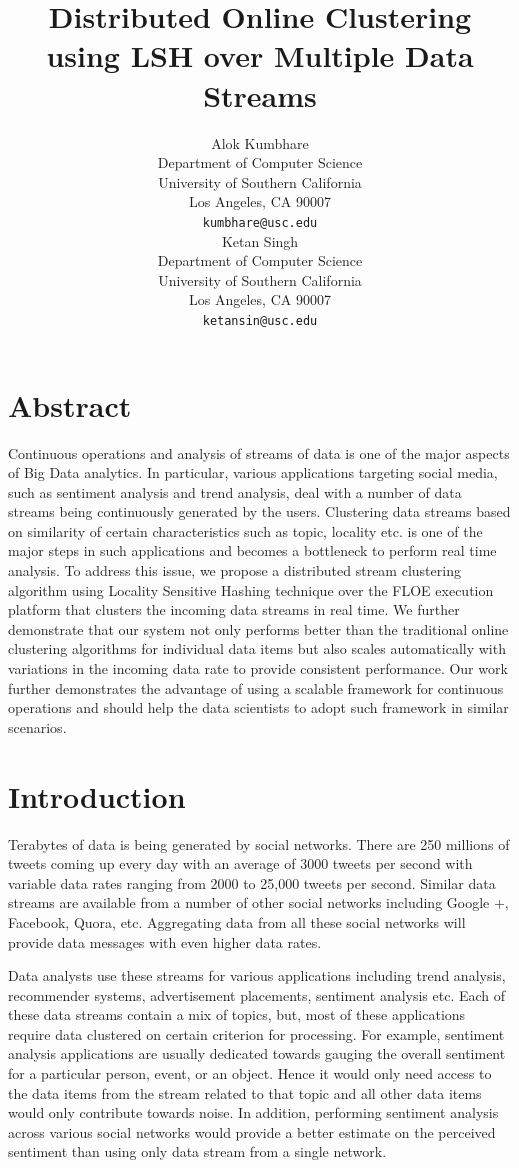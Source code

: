 \documentclass{article} %
\title{Distributed Online Clustering using LSH over Multiple Data Streams}
\author{
Alok Kumbhare \\
Department of Computer Science \\
University of Southern California \\
Los Angeles, CA 90007 \\
\texttt{kumbhare@usc.edu} \\
\And
Ketan Singh \\
Department of Computer Science \\
University of Southern California \\
Los Angeles, CA 90007 \\
\texttt{ketansin@usc.edu} \\
}
\begin{document}
\maketitle

\section{Abstract}
Continuous operations and analysis of streams of data is one of the major aspects of Big Data analytics. In particular, various applications targeting social media, such as sentiment analysis and trend analysis, deal with a number of data streams being continuously generated by the users. Clustering data streams based on similarity of certain characteristics such as topic, locality etc. is one of the major steps in such applications and becomes a bottleneck to perform real time analysis. To address this issue, we propose a distributed stream clustering algorithm using Locality Sensitive Hashing technique over the FLOE execution platform that clusters the incoming data streams in real time. We further demonstrate that our system not only performs better than the traditional online clustering algorithms for individual data items but also scales automatically with variations in the incoming data rate to provide consistent performance. Our work further demonstrates the advantage of using a scalable framework for continuous operations and should help the data scientists to adopt such framework in similar scenarios.


\section{Introduction}
Terabytes of data is being generated by social networks. There are 250 millions of tweets coming up every day with an average of 3000 tweets per second  with variable data rates ranging from 2000 to 25,000 tweets per second. Similar data streams are available from a number of other social networks including Google +, Facebook, Quora, etc.  Aggregating data from all these social networks will provide data messages with even higher data rates. 

Data analysts use these streams for various applications including trend analysis, recommender systems, advertisement placements, sentiment analysis etc. Each of these data streams contain a mix of topics, but, most of these applications require data clustered on certain criterion for processing. For example, sentiment analysis applications are usually dedicated towards gauging the overall sentiment for a particular person, event, or an object. Hence it would only need access to the data items from the stream related to that topic and all other data items would only contribute towards noise. In addition, performing sentiment analysis across various social networks would provide a better  estimate on the perceived  sentiment than using only data stream from a single network.
\end{document}
